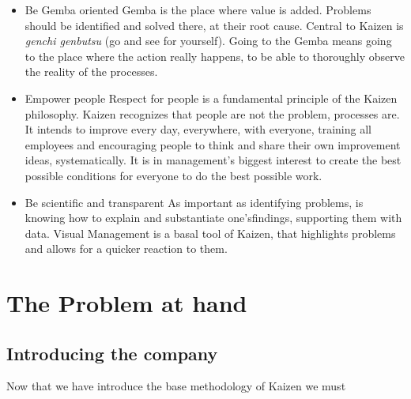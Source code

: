 \documentclass[]{article}
\begin{document}
\begin{itemize}
  \item Be Gemba oriented
    \subitem Gemba is the place where value is added. Problems should be identified and solved there, at their root cause.
    Central to Kaizen is \textit{genchi genbutsu} (go and see for yourself). Going to the Gemba means going to the place where the action really happens, to be able to thoroughly observe the reality of the processes.
  \item Empower people
    \subitem Respect for people is a fundamental principle of the Kaizen philosophy. Kaizen recognizes that people are not the problem, processes are. It intends to improve every day, everywhere, with everyone, training all employees and encouraging people to think and share their own improvement ideas, systematically. It is in management’s biggest interest to create the best possible conditions for everyone to do the best possible work.
  \item Be scientific and transparent
    \subitem As important as identifying problems, is knowing how to explain and substantiate one’sfindings, supporting them with data. Visual Management is a basal tool of Kaizen, that highlights problems and allows for a quicker reaction to them.
\end{itemize}
\clearpage
\newpage

\section{The Problem at hand}
\subsection{Introducing the company}

Now that we have introduce the base methodology of Kaizen we must 
\end{document}
